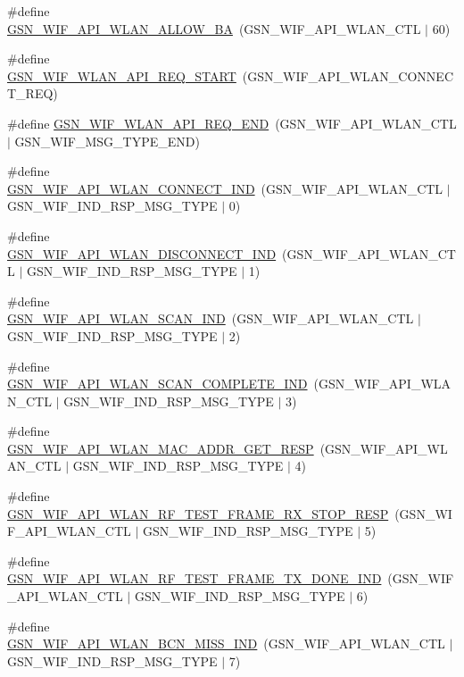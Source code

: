 \begin{DoxyCompactItemize}
\item 
\#define \hyperlink{a00606_a37da2db2071463c312f9e5013115c8c6}{GSN\_\-WIF\_\-API\_\-WLAN\_\-ALLOW\_\-BA}~(GSN\_\-WIF\_\-API\_\-WLAN\_\-CTL $|$ 60)
\item 
\#define \hyperlink{a00606_a6834e5d5979c600347ca1fb9bd01edcf}{GSN\_\-WIF\_\-WLAN\_\-API\_\-REQ\_\-START}~(GSN\_\-WIF\_\-API\_\-WLAN\_\-CONNECT\_\-REQ)
\item 
\#define \hyperlink{a00606_a3725193a651ad127aa95e6cd4776142a}{GSN\_\-WIF\_\-WLAN\_\-API\_\-REQ\_\-END}~(GSN\_\-WIF\_\-API\_\-WLAN\_\-CTL $|$ GSN\_\-WIF\_\-MSG\_\-TYPE\_\-END)
\item 
\#define \hyperlink{a00606_a4235ab97a11c5af4b6fd612919a35aa5}{GSN\_\-WIF\_\-API\_\-WLAN\_\-CONNECT\_\-IND}~(GSN\_\-WIF\_\-API\_\-WLAN\_\-CTL $|$ GSN\_\-WIF\_\-IND\_\-RSP\_\-MSG\_\-TYPE $|$ 0)
\item 
\#define \hyperlink{a00606_af905b59fa8d65ece02d1c3ad08f8e8e0}{GSN\_\-WIF\_\-API\_\-WLAN\_\-DISCONNECT\_\-IND}~(GSN\_\-WIF\_\-API\_\-WLAN\_\-CTL $|$ GSN\_\-WIF\_\-IND\_\-RSP\_\-MSG\_\-TYPE $|$ 1)
\item 
\#define \hyperlink{a00606_aecb8f3f1b29bed47468e3462e98d7134}{GSN\_\-WIF\_\-API\_\-WLAN\_\-SCAN\_\-IND}~(GSN\_\-WIF\_\-API\_\-WLAN\_\-CTL $|$ GSN\_\-WIF\_\-IND\_\-RSP\_\-MSG\_\-TYPE $|$ 2)
\item 
\#define \hyperlink{a00606_a3257f30439daa60e3cbfcebd93b4fcc9}{GSN\_\-WIF\_\-API\_\-WLAN\_\-SCAN\_\-COMPLETE\_\-IND}~(GSN\_\-WIF\_\-API\_\-WLAN\_\-CTL $|$ GSN\_\-WIF\_\-IND\_\-RSP\_\-MSG\_\-TYPE $|$ 3)
\item 
\#define \hyperlink{a00606_ab6d7629ede4a3c3793e60e919097f563}{GSN\_\-WIF\_\-API\_\-WLAN\_\-MAC\_\-ADDR\_\-GET\_\-RESP}~(GSN\_\-WIF\_\-API\_\-WLAN\_\-CTL $|$ GSN\_\-WIF\_\-IND\_\-RSP\_\-MSG\_\-TYPE $|$ 4)
\item 
\#define \hyperlink{a00606_ad12cca32c3658ab57938340a749d5b44}{GSN\_\-WIF\_\-API\_\-WLAN\_\-RF\_\-TEST\_\-FRAME\_\-RX\_\-STOP\_\-RESP}~(GSN\_\-WIF\_\-API\_\-WLAN\_\-CTL $|$ GSN\_\-WIF\_\-IND\_\-RSP\_\-MSG\_\-TYPE $|$ 5)
\item 
\#define \hyperlink{a00606_aa350d110b6d980a01a1556b23af7be4d}{GSN\_\-WIF\_\-API\_\-WLAN\_\-RF\_\-TEST\_\-FRAME\_\-TX\_\-DONE\_\-IND}~(GSN\_\-WIF\_\-API\_\-WLAN\_\-CTL $|$ GSN\_\-WIF\_\-IND\_\-RSP\_\-MSG\_\-TYPE $|$ 6)
\item 
\#define \hyperlink{a00606_ac5717c171a79a8a3989e00909337a097}{GSN\_\-WIF\_\-API\_\-WLAN\_\-BCN\_\-MISS\_\-IND}~(GSN\_\-WIF\_\-API\_\-WLAN\_\-CTL $|$ GSN\_\-WIF\_\-IND\_\-RSP\_\-MSG\_\-TYPE $|$ 7)

\end{DoxyCompactItemize}
